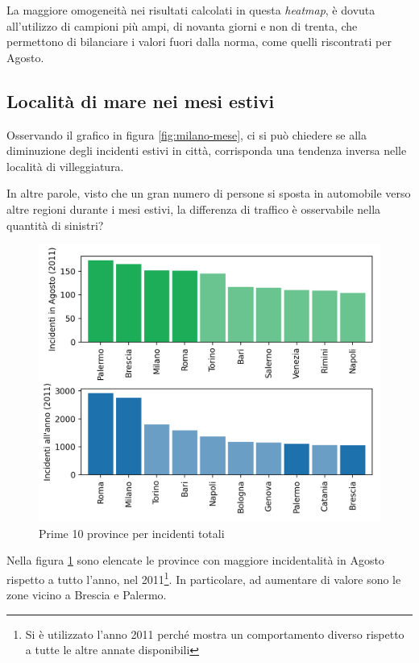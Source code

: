 \documentclass[a4paper]{report}
\newcommand{\quotestyle}[1]{\textit{#1}}
\begin{document}
La maggiore omogeneità nei risultati calcolati in questa \quotestyle{heatmap}, 
è dovuta all'utilizzo di campioni più ampi, di novanta giorni e non di trenta, 
che permettono di bilanciare i valori fuori dalla norma, 
come quelli riscontrati per Agosto. 

\subsection{Località di mare nei mesi estivi}

Osservando il grafico in figura \ref{fig:milano-mese}, 
ci si può chiedere se alla diminuzione degli incidenti estivi in città, 
corrisponda una tendenza inversa nelle località di villeggiatura.

In altre parole, visto che un gran numero di persone si sposta in automobile 
verso altre regioni durante i mesi estivi, la differenza di traffico è osservabile 
nella quantità di sinistri?

\begin{figure}
    \includegraphics[width=\linewidth]{../src/incidenti/incidenti_senza_coords/mese_incidenti/mesi_estivi.png}
    \caption{Prime 10 province per incidenti totali}
    \label{fig:mesi-estivi}
\end{figure}

Nella figura \ref{fig:mesi-estivi} sono elencate le province con maggiore incidentalità 
in Agosto rispetto a tutto l'anno, nel 
2011\footnote{Si è utilizzato l'anno 2011 perché mostra un comportamento diverso rispetto a 
tutte le altre annate disponibili}. 
In particolare, ad aumentare di valore sono le zone vicino a Brescia e Palermo. 
\end{document}
